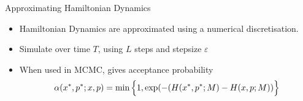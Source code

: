 \documentclass{beamer}
\begin{document}

\begin{frame}{Approximating Hamiltonian Dynamics}

\begin{itemize}
\item Hamiltonian Dynamics are approximated using a numerical discretisation. 

\item Simulate over time $T$, using $L$ steps and stepsize $\varepsilon$

\item When used in MCMC, gives acceptance probability $$ \alpha(x^{*}, p^{*} ;x, p) = \min \Big{\{} 1, \exp(-(H(x^{*}, p^{*};M) - H(x,p;M)) \Big{\}} $$

\end{itemize}

\end{frame}














\end{document}
